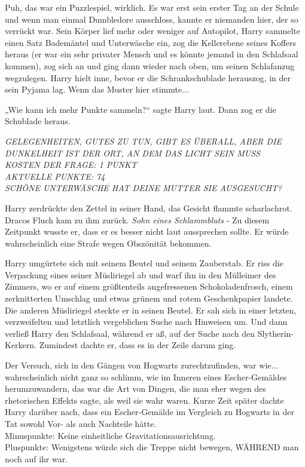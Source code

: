 {Puh, das war ein Puzzlespiel, wirklich. Es war erst sein erster Tag an der Schule und wenn man einmal Dumbledore ausschloss, kannte er niemanden hier, der so verrückt war. Sein Körper lief mehr oder weniger auf Autopilot, Harry sammelte einen Satz Bademäntel und Unterwäsche ein, zog die Kellerebene seines Koffers heraus (er war ein sehr privater Mensch und es könnte jemand in den Schlafsaal kommen), zog sich an und ging dann wieder nach oben, um seinen Schlafanzug wegzulegen. Harry hielt inne, bevor er die Schrankschublade herauszog, in der sein Pyjama lag. Wenn das Muster hier stimmte...

„Wie kann ich mehr Punkte sammeln?“ sagte Harry laut. Dann zog er die Schublade heraus.

\emph{GELEGENHEITEN, GUTES ZU TUN, GIBT ES ÜBERALL, ABER DIE DUNKELHEIT IST DER ORT, AN DEM DAS LICHT SEIN MUSS}\\ \emph{KOSTEN DER FRAGE: 1 PUNKT}\\ \emph{AKTUELLE PUNKTE: 74}\\ \emph{SCHÖNE UNTERWÄSCHE HAT DEINE MUTTER SIE AUSGESUCHT?}

Harry zerdrückte den Zettel in seiner Hand, das Gesicht flammte scharlachrot. Dracos Fluch kam zu ihm zurück. \emph{Sohn eines Schlammbluts} - Zu diesem Zeitpunkt wusste er, dass er es besser nicht laut aussprechen sollte. Er würde wahrscheinlich eine Strafe wegen Obszönität bekommen.

Harry umgürtete sich mit seinem Beutel und seinem Zauberstab. Er riss die Verpackung eines seiner Müsliriegel ab und warf ihn in den Mülleimer des Zimmers, wo er auf einem größtenteils angefressenen Schokoladenfrosch, einem zerknitterten Umschlag und etwas grünem und rotem Geschenkpapier landete. Die anderen Müsliriegel steckte er in seinen Beutel. Er sah sich in einer letzten, verzweifelten und letztlich vergeblichen Suche nach Hinweisen um. Und dann verließ Harry den Schlafsaal, während er aß, auf der Suche nach den Slytherin-Kerkern. Zumindest dachte er, dass es in der Zeile darum ging.

Der Versuch, sich in den Gängen von Hogwarts zurechtzufinden, war wie... wahrscheinlich nicht ganz so schlimm, wie im Inneren eines Escher-Gemäldes herumzuwandern, das war die Art von Dingen, die man eher wegen des rhetorischen Effekts sagte, als weil sie wahr waren. Kurze Zeit später dachte Harry darüber nach, dass ein Escher-Gemälde im Vergleich zu Hogwarts in der Tat sowohl Vor- als auch Nachteile hätte.\\ Minuspunkte: Keine einheitliche Gravitationsausrichtung.\\ Pluspunkte: Wenigstens würde sich die Treppe nicht bewegen, WÄHREND man noch auf ihr war.

}

